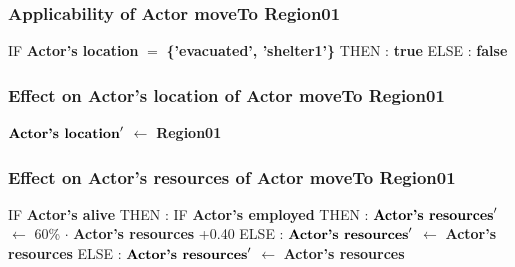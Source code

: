 \documentclass{article}%
\begin{document}
\subsubsection{Applicability of Actor moveTo Region01}%
\label{ssubsec:Applicability of Actor moveTo Region01}%
\begin{flushleft}%
IF %
\textbf{Actor's location}%
$=$%
\textbf{\{'evacuated', 'shelter1'\}}%
\linebreak%
\hspace*{2em}%
THEN %
: %
\textbf{true}%
\linebreak%
\hspace*{2em}%
ELSE %
: %
\textbf{false}%
\end{flushleft}

%
\subsubsection{Effect on Actor's location of Actor moveTo Region01}%
\label{ssubsec:Effect on Actor's location of Actor moveTo Region01}%
\begin{flushleft}%
$\mbox{\textbf{Actor's location}} '$%
$\leftarrow$%
\textbf{Region01}%
\end{flushleft}

%
\subsubsection{Effect on Actor's resources of Actor moveTo Region01}%
\label{ssubsec:Effect on Actor's resources of Actor moveTo Region01}%
\begin{flushleft}%
IF %
\textbf{Actor's alive}%
\linebreak%
\hspace*{2em}%
THEN %
: %
IF %
\textbf{Actor's employed}%
\linebreak%
\hspace*{4em}%
THEN %
: %
$\mbox{\textbf{Actor's resources}} '$%
$\leftarrow$%
60\%%
$\cdot$%
\textbf{Actor's resources}%
+0.40%
\linebreak%
\hspace*{4em}%
ELSE %
: %
$\mbox{\textbf{Actor's resources}} '$%
$\leftarrow$%
\textbf{Actor's resources}%
\linebreak%
\hspace*{2em}%
ELSE %
: %
$\mbox{\textbf{Actor's resources}} '$%
$\leftarrow$%
\textbf{Actor's resources}%
\end{flushleft}

%
\end{document}
